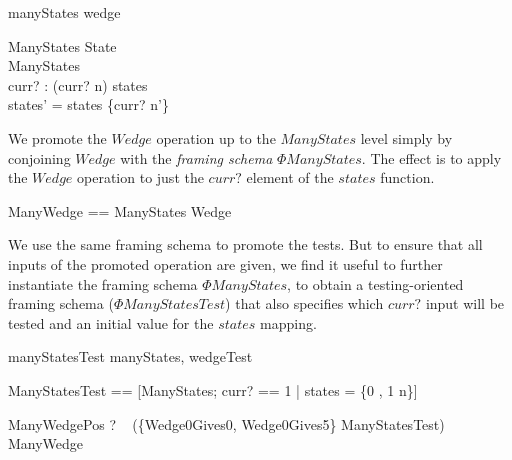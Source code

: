 \documentclass{llncs}
\begin{document}
\begin{zsection}
  \SECTION manyStates \parents wedge
\end{zsection}

\vspace{-5ex}
\begin{schema}{\Phi ManyStates}
  \Delta State \\
  \Delta ManyStates \\
  curr? : \nat
\where
  (curr? \mapsto n) \in states \\
  states' = states \oplus \{curr? \mapsto n'\}
\end{schema}

We promote the $Wedge$ operation up to the $ManyStates$ level simply by
conjoining $Wedge$ with the \emph{framing schema} $\Phi ManyStates$.
The effect is to apply the $Wedge$ operation to just the $curr?$ element of
the $states$ function.

\begin{zed}
  ManyWedge == \Phi ManyStates \land Wedge
\end{zed}


We use the same framing schema to promote the tests.  But to ensure
that all inputs of the promoted operation are given, we find it useful
to further instantiate the framing schema $\Phi ManyStates$, to obtain
a testing-oriented framing schema ($\Phi ManyStatesTest$) that also
specifies which $curr?$ input will be tested and an initial value for the
$states$ mapping.

\begin{zsection}
  \SECTION manyStatesTest \parents manyStates, wedgeTest
\end{zsection}
\vspace{-5ex}
\begin{zed}
  \Phi ManyStatesTest ==
    [\Phi ManyStates; curr? == 1 | states = \{0 , 1 \mapsto n\}]
\end{zed}
\vspace{-5ex}
\begin{theorem}{ManyWedgePos}
  \vdash? ~ (\{Wedge0Gives0, Wedge0Gives5\} \land \Phi ManyStatesTest)
      \subseteq ManyWedge
\end{theorem}
\end{document}
